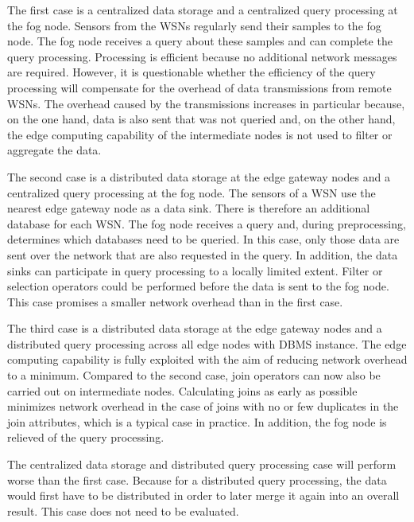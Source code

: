 \documentclass[english,version-2019-11]{uzl-thesis}
\begin{document}
The first case is a centralized data storage and a centralized query processing at the fog node. Sensors from the WSNs regularly send their samples to the fog node. The fog node receives a query about these samples and can complete the query processing. Processing is efficient because no additional network messages are required. However, it is questionable whether the efficiency of the query processing will compensate for the overhead of data transmissions from remote WSNs. The overhead caused by the transmissions increases in particular because, on the one hand, data is also sent that was not queried and, on the other hand, the edge computing capability of the intermediate nodes is not used to filter or aggregate the data.

The second case is a distributed data storage at the edge gateway nodes and a centralized query processing at the fog node. The sensors of a WSN use the nearest edge gateway node as a data sink. There is therefore an additional database for each WSN. The fog node receives a query and, during preprocessing, determines which databases need to be queried. In this case, only those data are sent over the network that are also requested in the query. In addition, the data sinks can participate in query processing to a locally limited extent. Filter or selection operators could be performed before the data is sent to the fog node. This case promises a smaller network overhead than in the first case.

The third case is a distributed data storage at the edge gateway nodes and a distributed query processing across all edge nodes with DBMS instance. The edge computing capability is fully exploited with the aim of reducing network overhead to a minimum. Compared to the second case, join operators can now also be carried out on intermediate nodes. Calculating joins as early as possible minimizes network overhead in the case of joins with no or few duplicates in the join attributes, which is a typical case in practice. In addition, the fog node is relieved of the query processing.

The centralized data storage and distributed query processing case will perform worse than the first case. Because for a distributed query processing, the data would first have to be distributed in order to later merge it again into an overall result. This case does not need to be evaluated.
\end{document}
